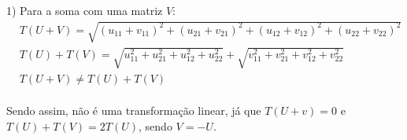 1) Para a soma com uma matriz $V$:\\

\[
    \begin{split}
        &T(U+V) = \sqrt{(u_{11}+v_{11})^2+(u_{21}+v_{21})^2+(u_{12}+v_{12})^2+(u_{22}+v_{22})^2}\\
        &T(U) + T(V)= \sqrt{u_{11}^2 + u_{21}^2 + u_{12}^2 + u_{22}^2} + \sqrt{v_{11}^2 + v_{21}^2 + v_{12}^2 + v_{22}^2}\\
        &T(U+V)\neq T(U)+T(V)
    \end{split}
\]
\\

Sendo assim, \textcolor{COLOR2}{não é uma transformação linear}, já que $T(U+v)=0$ e $T(U)+T(V) = 2T(U)$, sendo $V=-U$.\\